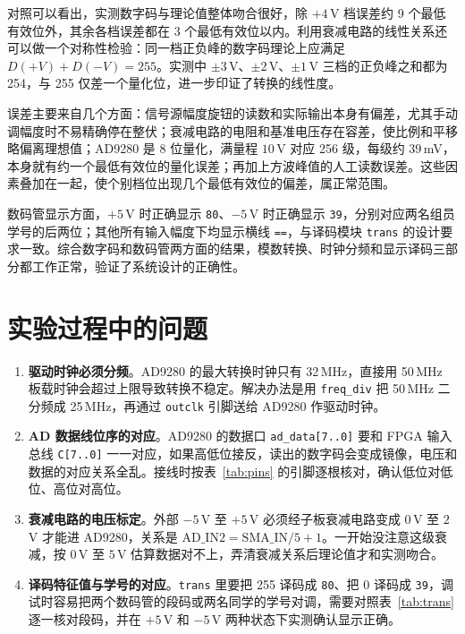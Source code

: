 \documentclass[12pt]{ctexart}
\begin{document}
对照可以看出，实测数字码与理论值整体吻合很好，除 $+4\,$V 档误差约 9 个最低有效位外，其余各档误差都在 3 个最低有效位以内。利用衰减电路的线性关系还可以做一个对称性检验：同一档正负峰的数字码理论上应满足 $D(+V) + D(-V) = 255$。实测中 $\pm3\,$V、$\pm2\,$V、$\pm1\,$V 三档的正负峰之和都为 254，与 255 仅差一个量化位，进一步印证了转换的线性度。

误差主要来自几个方面：信号源幅度旋钮的读数和实际输出本身有偏差，尤其手动调幅度时不易精确停在整伏；衰减电路的电阻和基准电压存在容差，使比例和平移略偏离理想值；AD9280 是 8 位量化，满量程 $10\,$V 对应 256 级，每级约 $39\,$mV，本身就有约一个最低有效位的量化误差；再加上方波峰值的人工读数误差。这些因素叠加在一起，使个别档位出现几个最低有效位的偏差，属正常范围。

数码管显示方面，$+5\,$V 时正确显示 \texttt{80}、$-5\,$V 时正确显示 \texttt{39}，分别对应两名组员学号的后两位；其他所有输入幅度下均显示横线 \texttt{==}，与译码模块 \texttt{trans} 的设计要求一致。综合数字码和数码管两方面的结果，模数转换、时钟分频和显示译码三部分都工作正常，验证了系统设计的正确性。

\section{实验过程中的问题}

\begin{enumerate}
    \item \textbf{驱动时钟必须分频}。AD9280 的最大转换时钟只有 32\,MHz，直接用 50\,MHz 板载时钟会超过上限导致转换不稳定。解决办法是用 \texttt{freq\_div} 把 50\,MHz 二分频成 25\,MHz，再通过 \texttt{outclk} 引脚送给 AD9280 作驱动时钟。
    \item \textbf{AD 数据线位序的对应}。AD9280 的数据口 \texttt{ad\_data[7..0]} 要和 FPGA 输入总线 \texttt{C[7..0]} 一一对应，如果高低位接反，读出的数字码会变成镜像，电压和数据的对应关系全乱。接线时按表~\ref{tab:pins} 的引脚逐根核对，确认低位对低位、高位对高位。
    \item \textbf{衰减电路的电压标定}。外部 $-5\,$V 至 $+5\,$V 必须经子板衰减电路变成 $0\,$V 至 $2\,$V 才能进 AD9280，关系是 $\mathrm{AD\_IN2} = \mathrm{SMA\_IN}/5 + 1$。一开始没注意这级衰减，按 $0\,$V 至 $5\,$V 估算数据对不上，弄清衰减关系后理论值才和实测吻合。
    \item \textbf{译码特征值与学号的对应}。\texttt{trans} 里要把 255 译码成 \texttt{80}、把 0 译码成 \texttt{39}，调试时容易把两个数码管的段码或两名同学的学号对调，需要对照表~\ref{tab:trans} 逐一核对段码，并在 $+5\,$V 和 $-5\,$V 两种状态下实测确认显示正确。
\end{enumerate}
\end{document}
